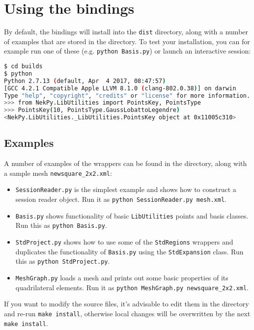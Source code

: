 \section{Using the bindings}

By default, the bindings will install into the \texttt{dist} directory, along with a
number of examples that are stored in the 
 directory. To 
test your installation, you can for example run one of these (e.g. \texttt{python Basis.py}) or
launch an interactive session:

\begin{lstlisting}[language=bash]
$ cd builds
$ python
Python 2.7.13 (default, Apr  4 2017, 08:47:57) 
[GCC 4.2.1 Compatible Apple LLVM 8.1.0 (clang-802.0.38)] on darwin
Type "help", "copyright", "credits" or "license" for more information.
>>> from NekPy.LibUtilities import PointsKey, PointsType
>>> PointsKey(10, PointsType.GaussLobattoLegendre)
<NekPy.LibUtilities._LibUtilities.PointsKey object at 0x11005c310>
\end{lstlisting}

\subsection{Examples}

A number of examples of the wrappers can be found in the 
directory, along with a sample mesh \texttt{newsquare\_2x2.xml}:

\begin{itemize}
	\item \texttt{SessionReader.py} is the simplest example and shows how to construct a
  		session reader object. Run it as \texttt{python SessionReader.py mesh.xml}.
  	\item \texttt{Basis.py} shows functionality of basic \texttt{LibUtilities} points and basis
  		classes. Run this as \texttt{python Basis.py}.
	\item \texttt{StdProject.py} shows how to use some of the \texttt{StdRegions} wrappers and
  		duplicates the functionality of \texttt{Basis.py} using the \texttt{StdExpansion} class. Run
  		this as \texttt{python StdProject.py}.
	\item \texttt{MeshGraph.py} loads a mesh and prints out some basic properties of its
		quadrilateral elements. Run it as \texttt{python MeshGraph.py newsquare\_2x2.xml}.
\end{itemize}

If you want to modify the source files, it's advisable to edit them in the
 directory and 
re-run \texttt{make install}, otherwise local changes will be overwritten by the next \texttt{make install}.
